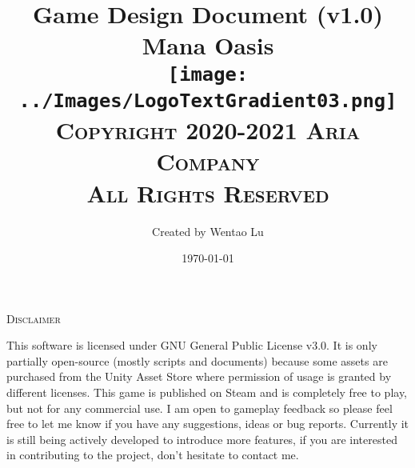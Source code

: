 \documentclass[11pt]{article}
\title{%
  Game Design Document (v1.0)\\
  \vspace{5mm}
  \Huge{Mana Oasis}\large\\
  \vspace{10mm}
  \texttt{[image: ../Images/LogoTextGradient03.png]}\\
  \vspace{10mm}
  \textsc{Copyright} \raisebox{0.15ex}{\resizebox{!}{1.1ex}{\textcopyright}} 2020-2021 \textsc{Aria Company}\\
  \vspace{2mm}
  \textsc{All Rights Reserved}
  \vspace{5mm}
}
\author{\large{Created by Wentao Lu}}
\date{\large{\today}}
\begin{document}

  \maketitle
  \newpage

  \doublespacing
  \noindent{}
  \noindent{}

  \vspace{8mm}
  \begin{center}\Large\textsc{Disclaimer}\end{center}\normalsize
  \vspace{1mm}
  This software is licensed under GNU General Public License v3.0. It is only partially open-source (mostly scripts and documents) because some assets are purchased from the Unity Asset Store where permission of usage is granted by different licenses. This game is published on Steam and is completely free to play, but not for any commercial use. I am open to gameplay feedback so please feel free to let me know if you have any suggestions, ideas or bug reports. Currently it is still being actively developed to introduce more features, if you are interested in contributing to the project, don't hesitate to contact me.
\end{document}
